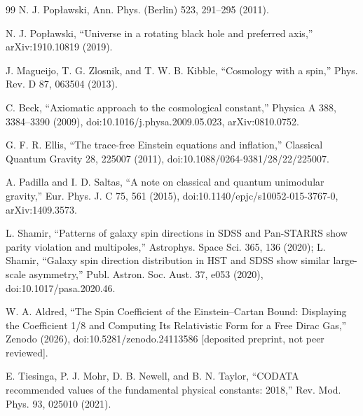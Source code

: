 \documentclass[11pt]{article}
\begin{document}
\begin{thebibliography}{99}
 N. J. Pop{\l}awski, Ann. Phys.
(Berlin) 523, 291--295 (2011).

 N. J. Pop{\l}awski, ``Universe in a rotating
black hole and preferred axis,'' arXiv:1910.10819 (2019).

 J. Magueijo, T. G. Zlosnik, and T. W. B. Kibble,
``Cosmology with a spin,'' Phys. Rev. D 87, 063504 (2013).

 C. Beck, ``Axiomatic approach to the cosmological
constant,'' Physica A 388, 3384--3390 (2009),
doi:10.1016/j.physa.2009.05.023, arXiv:0810.0752.

 G. F. R. Ellis, ``The trace-free
Einstein equations and inflation,'' Classical Quantum Gravity 28,
225007 (2011), doi:10.1088/0264-9381/28/22/225007.

 A. Padilla and I. D. Saltas, ``A note on classical
and quantum unimodular gravity,'' Eur. Phys. J. C 75, 561 (2015),
doi:10.1140/epjc/s10052-015-3767-0, arXiv:1409.3573.

 L. Shamir, ``Patterns of galaxy spin directions in
SDSS and Pan-STARRS show parity violation and multipoles,''
Astrophys. Space Sci. 365, 136 (2020); L. Shamir, ``Galaxy spin
direction distribution in HST and SDSS show similar large-scale
asymmetry,'' Publ. Astron. Soc. Aust. 37, e053 (2020),
doi:10.1017/pasa.2020.46.

 W. A. Aldred, ``The Spin Coefficient of the
Einstein--Cartan Bound: Displaying the Coefficient 1/8 and Computing
Its Relativistic Form for a Free Dirac Gas,'' Zenodo (2026),
doi:10.5281/zenodo.24113586 [deposited preprint, not peer reviewed].

 E. Tiesinga, P. J. Mohr, D. B. Newell, and
B. N. Taylor, ``CODATA recommended values of the fundamental physical
constants: 2018,'' Rev. Mod. Phys. 93, 025010 (2021).

\end{thebibliography}
\end{document}

